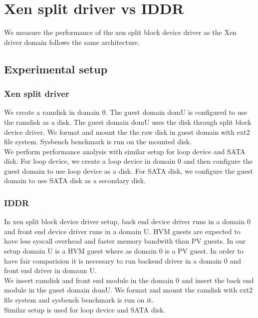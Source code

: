 \section{Xen split driver vs IDDR}
We measure the performance of the xen split block device driver as the Xen driver domain follows the same architecture.
\subsection{Experimental setup}
\subsubsection*{Xen split driver}
We create a ramdisk in domain 0. The guest domain domU is configured to use the ramdisk as a disk. The guest domain domU uses the disk through split block device driver. We format and mount the the raw disk in guest domain with ext2 file system. Sysbench benchmark is run on the mounted disk.
\\[3mm]
We perform performance analysis with similar setup for loop device and SATA disk. For loop device, we create a loop device in domain 0 and then configure the guest domain to use loop device as a disk. For SATA disk, we configure the guest domain to use SATA disk as a secondary disk. 
\subsubsection*{IDDR}
In xen split block device driver setup, back end device driver runs in a domain 0 and front end device driver runs in a domain U. HVM guests are expected to have less syscall overhead and faster memory bandwith than PV guests. In our setup domain U is a HVM guest where as domain 0 is a PV guest. In order to have fair comparision it is necessary to run backend driver in a domain 0 and front end driver in domaun U.
\\[3mm]
We insert ramdisk and front end module in the domain 0 and insert the back end module in the guest domain domU. We format and mount the ramdisk with ext2 file system and sysbench benchmark is run on it.  
\\[3mm]
Similar setup is used for loop device and SATA disk.
